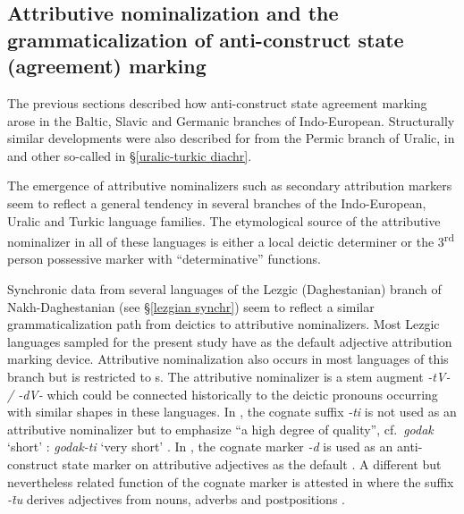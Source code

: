 {\subsection[Attributive nominalization and anti\hyp{}construct state]{Attributive nominalization and the grammaticalization of anti\hyp{}construct state (agreement) marking}
The previous sections described how anti\hyp{}construct state agreement marking arose in the Baltic, Slavic and Germanic branches of Indo-European. Structurally similar developments were also described for  from the Permic branch of Uralic, in  and other so-called  in \S\ref{uralic-turkic diachr}. 

The emergence of attributive nominalizers such as secondary attribution markers seem to reflect a general tendency in several branches of the Indo-European, Uralic and Turkic language families. The etymological source of the attributive nominalizer in all of these languages is either a local deictic determiner or the 3\textsuperscript{rd} person possessive marker with “determinative” functions.

Synchronic data from several languages of the Lezgic (Daghestanian) branch of Nakh-Daghestanian (see \S\ref{lezgian synchr}) seem to reflect a similar grammaticalization path from deictics to attributive nominalizers. Most Lezgic languages sampled for the present study have  as the default adjective attribution marking device. Attributive nominalization also occurs in most languages of this branch but is restricted to s. The attributive nominalizer is a stem augment \textit{-tV- / -dV-} which could be connected historically to the deictic pronouns occurring with similar shapes in these languages. In , the cognate suffix \textit{-ti} is not used as an attributive nominalizer but to emphasize “a high degree of quality”, cf.~\textit{godak} ‘short’ : \textit{godak-ti} ‘very short’ \citep[267]{alekseev1994b}. In , the cognate marker \textit{-d} is used as an anti\hyp{}construct state marker on attributive adjectives as the default \citep[224]{alekseev1994a}. A different but nevertheless related function of the cognate marker is attested in  where the suffix \textit{-t̄u} derives adjectives from nouns, adverbs and postpositions \citep[318]{kibrik1994b}.

}
